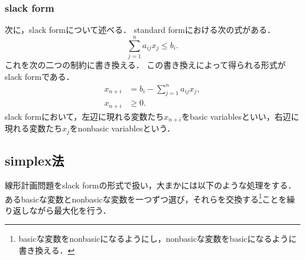 \documentclass{jsarticle}
\begin{document}
\subsubsection{slack form}
次に，slack formについて述べる．
standard formにおける次の式がある．
\[\sum_{j=1}^n a_{ij}x_j \le b_i.\]
これを次の二つの制約に書き換える．
この書き換えによって得られる形式がslack formである．
\begin{align*}
  x_{n+i} &= b_i - \sum_{j=1}^n a_{ij}x_j,\\
  x_{n+i} &\ge 0.
\end{align*}
slack formにおいて，左辺に現れる変数たち$x_{n+i}$をbasic variablesといい，右辺に現れる変数たち$x_j$をnonbasic variablesという．

\subsection{simplex法}
線形計画問題をslack formの形式で扱い，大まかには以下のような処理をする．
あるbasicな変数とnonbasicな変数を一つずつ選び，それらを交換する\footnote{basicな変数をnonbasicになるようにし，nonbasicな変数をbasicになるように書き換える．}ことを繰り返しながら最大化を行う．
\end{document}
